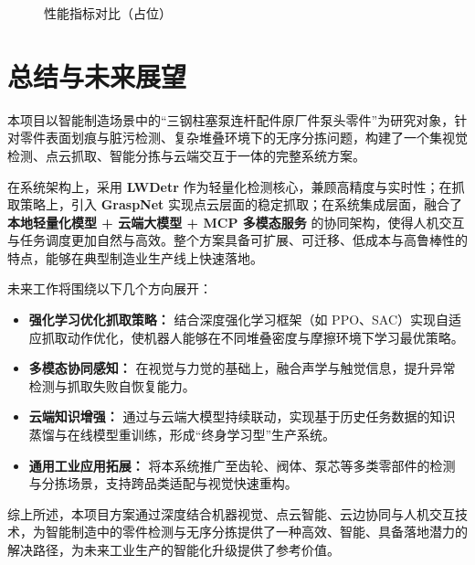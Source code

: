 \documentclass{cumcmthesis}
\begin{document}
\begin{figure}[htbp]\centering
{}
\caption{性能指标对比（占位）}\label{fig:metrics}
\end{figure}

\section{总结与未来展望}

本项目以智能制造场景中的“三钢柱塞泵连杆配件原厂件泵头零件”为研究对象，针对零件表面划痕与脏污检测、复杂堆叠环境下的无序分拣问题，构建了一个集视觉检测、点云抓取、智能分拣与云端交互于一体的完整系统方案。

在系统架构上，采用 \textbf{LWDetr} 作为轻量化检测核心，兼顾高精度与实时性；在抓取策略上，引入 \textbf{GraspNet} 实现点云层面的稳定抓取；在系统集成层面，融合了 \textbf{本地轻量化模型 + 云端大模型 + MCP 多模态服务} 的协同架构，使得人机交互与任务调度更加自然与高效。整个方案具备可扩展、可迁移、低成本与高鲁棒性的特点，能够在典型制造业生产线上快速落地。

未来工作将围绕以下几个方向展开：

\begin{itemize}
    \item \textbf{强化学习优化抓取策略：} 结合深度强化学习框架（如 PPO、SAC）实现自适应抓取动作优化，使机器人能够在不同堆叠密度与摩擦环境下学习最优策略。
    \item \textbf{多模态协同感知：} 在视觉与力觉的基础上，融合声学与触觉信息，提升异常检测与抓取失败自恢复能力。
    \item \textbf{云端知识增强：} 通过与云端大模型持续联动，实现基于历史任务数据的知识蒸馏与在线模型重训练，形成“终身学习型”生产系统。
    \item \textbf{通用工业应用拓展：} 将本系统推广至齿轮、阀体、泵芯等多类零部件的检测与分拣场景，支持跨品类适配与视觉快速重构。
\end{itemize}

综上所述，本项目方案通过深度结合机器视觉、点云智能、云边协同与人机交互技术，为智能制造中的零件检测与无序分拣提供了一种高效、智能、具备落地潜力的解决路径，为未来工业生产的智能化升级提供了参考价值。
\newpage

\end{document}
